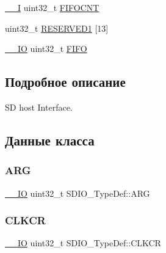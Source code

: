 \begin{DoxyCompactItemize}
\mbox{\hyperlink{group___c_m_s_i_s___c_m3__core__definitions_gaf63697ed9952cc71e1225efe205f6cd3}{\+\_\+\+\_\+I}} uint32\+\_\+t \mbox{\hyperlink{struct_s_d_i_o___type_def_ae30d52b6556f5d17db8e5cfd2641e7b4}{F\+I\+F\+O\+C\+NT}}
\item 
uint32\+\_\+t \mbox{\hyperlink{struct_s_d_i_o___type_def_a4017b35303754e115249d3c75bdf6894}{R\+E\+S\+E\+R\+V\+E\+D1}} \mbox{[}13\mbox{]}
\item 
\mbox{\hyperlink{group___c_m_s_i_s___c_m3__core__definitions_gaec43007d9998a0a0e01faede4133d6be}{\+\_\+\+\_\+\+IO}} uint32\+\_\+t \mbox{\hyperlink{struct_s_d_i_o___type_def_ab4757027388ea3a0a6f114d7de2ed4cf}{F\+I\+FO}}
\end{DoxyCompactItemize}


\subsection{Подробное описание}
SD host Interface. 

\subsection{Данные класса}
\mbox{\label{struct_s_d_i_o___type_def_a3e24392875e98cd09043e54a0990ab7a}} 
\subsubsection{\texorpdfstring{ARG}{ARG}}
{\footnotesize\ttfamily \mbox{\hyperlink{group___c_m_s_i_s___c_m3__core__definitions_gaec43007d9998a0a0e01faede4133d6be}{\+\_\+\+\_\+\+IO}} uint32\+\_\+t S\+D\+I\+O\+\_\+\+Type\+Def\+::\+A\+RG}

\mbox{\label{struct_s_d_i_o___type_def_aeb1e30ce2038628e45264f75e5e926bb}} 
\subsubsection{\texorpdfstring{CLKCR}{CLKCR}}
{\footnotesize\ttfamily \mbox{\hyperlink{group___c_m_s_i_s___c_m3__core__definitions_gaec43007d9998a0a0e01faede4133d6be}{\+\_\+\+\_\+\+IO}} uint32\+\_\+t S\+D\+I\+O\+\_\+\+Type\+Def\+::\+C\+L\+K\+CR}

